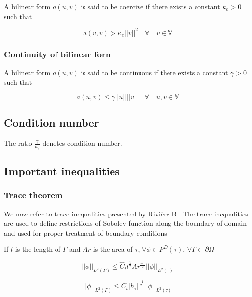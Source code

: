 \documentclass[a4paper,openany]{book}
\begin{document}
\begin{appendices}
A bilinear form $a(u,v)$ is said to be coercive if there exists a constant $\kappa_e > 0$ such that

\begin{equation}\label{Coercivity}
a(v,v) > \kappa_e ||v||^2   \quad \forall \quad v \in  \mathbb{V}
\end{equation}

\subsubsection{Continuity of bilinear form}

A bilinear form $a(u,v)$ is said to be continuous if there exists a constant $\gamma > 0$ such that

\begin{equation}\label{Continuity_constant}
a(u,v) \leq \gamma ||u||||v|| \quad  \forall \quad u,v \in  \mathbb{V}
\end{equation}

\subsection{Condition number}

The ratio $\frac{\gamma}{\kappa_e}$ denotes condition number.

\subsection{Important inequalities}

\subsubsection{Trace theorem} 

We now refer to trace inequalities presented by Rivi\`ere B.\cite{riviere}. The trace inequalities are used to define restrictions of Sobolev function along the boundary of domain and used for proper treatment of boundary conditions. 

If $l$ is the length of $\Gamma$ and $Ar$ is the area of $\tau$,  $\forall \phi \in P^D (\tau)$, $\forall \Gamma \subset \partial \Omega$

\begin{equation}
||\phi||_{L^2(\Gamma)} \leq \hat{C}_t l^{\frac{1}{2}} Ar^{\frac{-1}{2}} ||\phi||_{L^2(\tau)}
\end{equation}

\begin{equation}
||\phi||_{L^2(\Gamma)} \leq {C}_t |h_\tau|^{\frac{-1}{2}} ||\phi||_{L^2(\tau)}
\end{equation}


\end{appendices}
\end{document}
